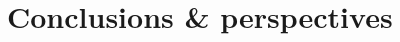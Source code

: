 \documentclass[../main/main.tex]{subfiles}
\begin{document}
\part*{Conclusions \& perspectives}\label{cp:conclusions}
\end{document}
